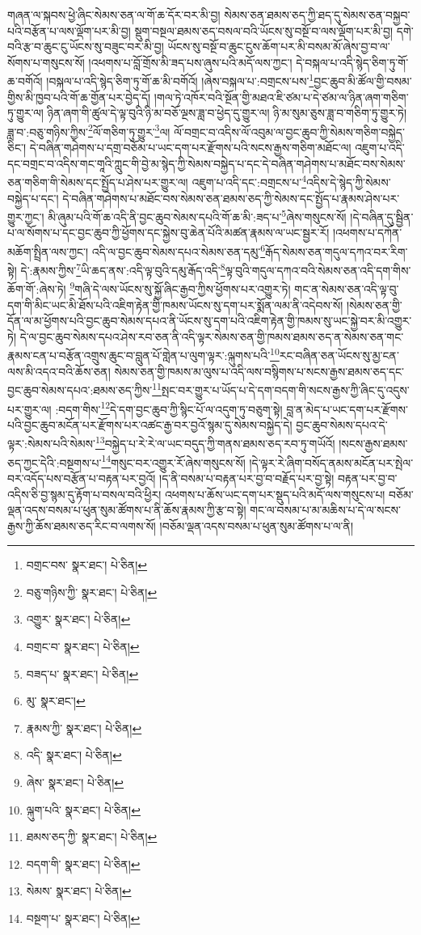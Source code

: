 གཞན་ལ་སྐབས་ཕྱེ་ཞིང་སེམས་ཅན་ལ་གོ་ཆ་དོར་བར་མི་བྱ། སེམས་ཅན་ཐམས་ཅད་ཀྱི་ཐད་དུ་སེམས་ཅན་བསྐྱབ་པའི་བརྩོན་པ་ལས་ལྡོག་པར་མི་བྱ། སྡུག་བསྔལ་ཐམས་ཅད་བསལ་བའི་ཡོངས་སུ་བསྔོ་བ་ལས་ལྡོག་པར་མི་བྱ། དགེ་བའི་རྩ་བ་ཆུང་ངུ་ཡོངས་སུ་བཟུང་བར་མི་བྱ། ཡོངས་སུ་བསྔོ་བ་ཆུང་ངུས་ཆོག་པར་མི་བསམ་མོ་ཞེས་བྱ་བ་ལ་སོགས་པ་གསུངས་སོ། །འཕགས་པ་བློ་གྲོས་མི་ཟད་པས་ཞུས་པའི་མདོ་ལས་ཀྱང་། དེ་བསྐལ་པ་འདི་སྙེད་ཅིག་ཏུ་གོ་ཆ་བགོའོ། །བསྐལ་པ་འདི་སྙེད་ཅིག་ཏུ་གོ་ཆ་མི་བགོའོ། །ཞེས་བསྐལ་པ་:བགྲངས་པས་\footnote{བགྲང་བས་  སྣར་ཐང་།  པེ་ཅིན། }བྱང་ཆུབ་མི་ཚོལ་གྱི་བསམ་གྱིས་མི་ཁྱབ་པའི་གོ་ཆ་གྱོན་པར་བྱེད་དོ། །གལ་ཏེ་འཁོར་བའི་སྔོན་གྱི་མཐའ་ཇི་ཙམ་པ་དེ་ཙམ་ལ་ཉིན་ཞག་གཅིག་ཏུ་གྱུར་ལ། ཉིན་ཞག་གི་ཚུལ་དེ་ལྟ་བུའི་ཉི་མ་བཅོ་ལྔས་ཟླ་བ་ཕྱེད་དུ་གྱུར་ལ། ཉི་མ་སུམ་ཅུས་ཟླ་བ་གཅིག་ཏུ་གྱུར་ཏེ། ཟླ་བ་:བཅུ་གཉིས་ཀྱིས་\footnote{བཅུ་གཉིས་ཀྱི་  སྣར་ཐང་།  པེ་ཅིན། }ལོ་གཅིག་ཏུ་གྱུར་\footnote{འགྱུར་  སྣར་ཐང་།  པེ་ཅིན། }ལ། ལོ་བགྲང་བ་འདིས་ལོ་འབུམ་ལ་བྱང་ཆུབ་ཀྱི་སེམས་གཅིག་བསྐྱེད་ཅིང་། དེ་བཞིན་གཤེགས་པ་དགྲ་བཅོམ་པ་ཡང་དག་པར་རྫོགས་པའི་སངས་རྒྱས་གཅིག་མཐོང་ལ། འཇུག་པ་འདི་དང་བགྲང་བ་འདིས་གང་གཱའི་ཀླུང་གི་བྱེ་མ་སྙེད་ཀྱི་སེམས་བསྐྱེད་པ་དང་དེ་བཞིན་གཤེགས་པ་མཐོང་བས་སེམས་ཅན་གཅིག་གི་སེམས་དང་སྤྱོད་པ་ཤེས་པར་གྱུར་ལ། འཇུག་པ་འདི་དང་:བགྲངས་པ་\footnote{བགྲང་བ་  སྣར་ཐང་།  པེ་ཅིན། }འདིས་དེ་སྙེད་ཀྱི་སེམས་བསྐྱེད་པ་དང་། དེ་བཞིན་གཤེགས་པ་མཐོང་བས་སེམས་ཅན་ཐམས་ཅད་ཀྱི་སེམས་དང་སྤྱོད་པ་རྣམས་ཤེས་པར་གྱུར་ཀྱང་། མི་ཞུམ་པའི་གོ་ཆ་འདི་ནི་བྱང་ཆུབ་སེམས་དཔའི་གོ་ཆ་མི་:ཟད་པ་\footnote{བཟད་པ་  སྣར་ཐང་།  པེ་ཅིན། }ཞེས་གསུངས་སོ། །དེ་བཞིན་དུ་སྦྱིན་པ་ལ་སོགས་པ་དང་བྱང་ཆུབ་ཀྱི་ཕྱོགས་དང་སྐྱེས་བུ་ཆེན་པོའི་མཚན་རྣམས་ལ་ཡང་སྦྱར་རོ། །འཕགས་པ་དཀོན་མཆོག་སྤྲིན་ལས་ཀྱང་། འདི་ལ་བྱང་ཆུབ་སེམས་དཔའ་སེམས་ཅན་དམུ་\footnote{མུ་  སྣར་ཐང་། }རྒོད་སེམས་ཅན་གདུལ་དཀའ་བར་རིག་སྟེ། དེ་:རྣམས་ཀྱིས་\footnote{རྣམས་ཀྱི་  སྣར་ཐང་།  པེ་ཅིན། }ཡི་ཆད་ནས་:འདི་ལྟ་བུའི་དམུ་རྒོད་འདི་\footnote{འདི་  སྣར་ཐང་།  པེ་ཅིན། }ལྟ་བུའི་གདུལ་དཀའ་བའི་སེམས་ཅན་འདི་དག་གིས་ཆོག་གོ་:ཞེས་ཏེ། \footnote{ཞེས་  སྣར་ཐང་།  པེ་ཅིན། }གཞི་དེ་ལས་ཡོངས་སུ་སྐྱོ་ཞིང་རྒྱབ་ཀྱིས་ཕྱོགས་པར་འགྱུར་ཏེ། གང་ན་སེམས་ཅན་འདི་ལྟ་བུ་དག་གི་མིང་ཡང་མི་ཐོས་པའི་འཇིག་རྟེན་གྱི་ཁམས་ཡོངས་སུ་དག་པར་སྨོན་ལམ་ནི་འདེབས་སོ། །སེམས་ཅན་གྱི་དོན་ལ་མ་ཕྱོགས་པའི་བྱང་ཆུབ་སེམས་དཔའ་ནི་ཡོངས་སུ་དག་པའི་འཇིག་རྟེན་གྱི་ཁམས་སུ་ཡང་སྐྱེ་བར་མི་འགྱུར་ཏེ། དེ་ལ་བྱང་ཆུབ་སེམས་དཔའ་ཤེས་རབ་ཅན་ནི་འདི་ལྟར་སེམས་ཅན་གྱི་ཁམས་ཐམས་ཅད་ན་སེམས་ཅན་གང་རྣམས་ངན་པ་བརྩོན་འགྲུས་ཆུང་བ་བླུན་པོ་གླེན་པ་ལུག་ལྟར་:ལྐུགས་པའི་\footnote{ལྐུག་པའི་  སྣར་ཐང་།  པེ་ཅིན། }རང་བཞིན་ཅན་ཡོངས་སུ་མྱ་ངན་ལས་མི་འདའ་བའི་ཆོས་ཅན། སེམས་ཅན་གྱི་ཁམས་མ་ལུས་པ་འདི་ལས་བསྙིགས་པ་སངས་རྒྱས་ཐམས་ཅད་དང་བྱང་ཆུབ་སེམས་དཔའ་:ཐམས་ཅད་ཀྱིས་\footnote{ཐམས་ཅད་ཀྱི་  སྣར་ཐང་།  པེ་ཅིན། }སྤང་བར་གྱུར་པ་ཡོད་པ་དེ་དག་བདག་གི་སངས་རྒྱས་ཀྱི་ཞིང་དུ་འདུས་པར་གྱུར་ལ། :བདག་གིས་\footnote{བདག་གི་  སྣར་ཐང་།  པེ་ཅིན། }དེ་དག་བྱང་ཆུབ་ཀྱི་སྙིང་པོ་ལ་འདུག་ཏུ་བཅུག་སྟེ། བླ་ན་མེད་པ་ཡང་དག་པར་རྫོགས་པའི་བྱང་ཆུབ་མངོན་པར་རྫོགས་པར་འཚང་རྒྱ་བར་བྱའོ་སྙམ་དུ་སེམས་བསྐྱེད་དེ། བྱང་ཆུབ་སེམས་དཔའ་དེ་ལྟར་:སེམས་པའི་སེམས་\footnote{སེམས་  སྣར་ཐང་།  པེ་ཅིན། }བསྐྱེད་པ་རེ་རེ་ལ་ཡང་བདུད་ཀྱི་གནས་ཐམས་ཅད་རབ་ཏུ་གཡོའོ། །སངས་རྒྱས་ཐམས་ཅད་ཀྱང་དེའི་:བསྔགས་པ་\footnote{བསྔག་པ་  སྣར་ཐང་།  པེ་ཅིན། }གསུང་བར་འགྱུར་རོ་ཞེས་གསུངས་སོ། །དེ་ལྟར་རེ་ཞིག་བསོད་ནམས་མངོན་པར་སྤེལ་བར་འདོད་པས་བརྩོན་པ་བརྟན་པར་བྱའོ། །ད་ནི་བསམ་པ་བརྟན་པར་བྱ་བ་བརྗོད་པར་བྱ་སྟེ། བརྟན་པར་བྱ་བ་འདིས་ཅི་བྱ་སྙམ་དུ་རྟོག་པ་བསལ་བའི་ཕྱིར། འཕགས་པ་ཆོས་ཡང་དག་པར་སྡུད་པའི་མདོ་ལས་གསུངས་པ། བཅོམ་ལྡན་འདས་བསམ་པ་ཕུན་སུམ་ཚོགས་པ་ནི་ཆོས་རྣམས་ཀྱི་རྩ་བ་སྟེ། གང་ལ་བསམ་པ་མ་མཆིས་པ་དེ་ལ་སངས་རྒྱས་ཀྱི་ཆོས་ཐམས་ཅད་རིང་བ་ལགས་སོ། །བཅོམ་ལྡན་འདས་བསམ་པ་ཕུན་སུམ་ཚོགས་པ་ལ་ནི། 
